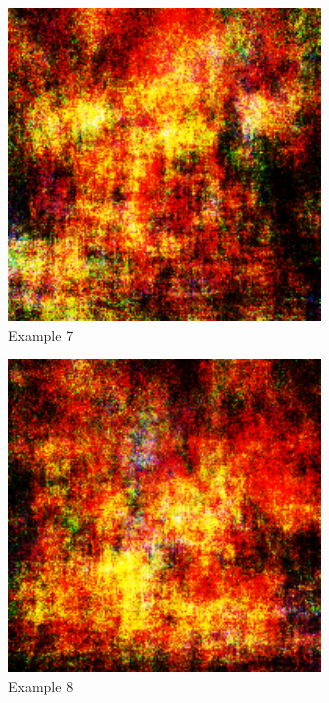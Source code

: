     \begin{figure}[htb!] 
    	\centering
    	\includegraphics[width=0.7\linewidth]{15500-1.pdf}
    	\caption{Example 7}
    	\label{fig:15500-1}
    \end{figure}    

    \begin{figure}[htb!] 
    	\centering
    	\includegraphics[width=0.7\linewidth]{15500-2.pdf}
    	\caption{Example 8}
    	\label{fig:15500-2}
    \end{figure} 

